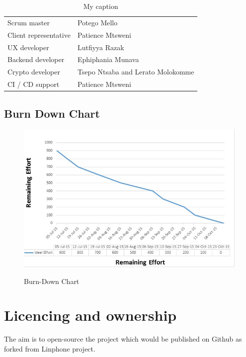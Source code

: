 \documentclass[a4paper]{article}
\begin{document}
\begin{table}[h]
\centering
\caption{My caption}
\label{User Roles}
\begin{tabular}{ll}
Scrum master & Potego Mello\\
Client representative & Patience Mtsweni\\
UX developer & Lutfiyya Razak\\
Backend developer & Ephiphania Munava\\
Crypto developer & Tsepo Ntsaba and Lerato Molokomme\\
CI / CD support & Patience Mtsweni
\end{tabular}
\end{table}

\subsection{Burn Down Chart}
\begin{figure}[H]
\includegraphics[width=1\linewidth]{./pictures/burnDown.jpg}\\
\caption{\label{fig:Burn-down chart}Burn-Down Chart}
\end{figure}
\newpage

\section{Licencing and ownership}
The aim is to open-source the project which would be published on Github as forked from Linphone project. 
\end{document}
